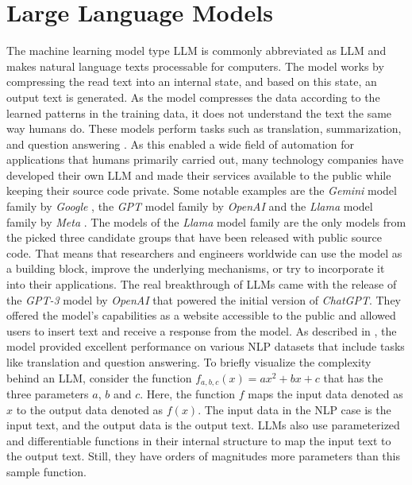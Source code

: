 \documentclass[draft,final]{thesisclass} %
\begin{document}
\section{Large Language Models}
The machine learning model type \gls{LLM} is commonly abbreviated as \gls{LLM} and makes natural language texts processable for computers.
The model works by compressing the read text into an internal state, and based on this state, an output text is generated.
As the model compresses the data according to the learned patterns in the training data, it does not understand the text the same way humans do.
These models perform tasks such as translation, summarization, and question answering \parencite[1]{llm_literature_review}.
As this enabled a wide field of automation for applications that humans primarily carried out, many technology companies have developed their own \gls{LLM} and made their services available to the public while keeping their source code private.
Some notable examples are the \textit{Gemini} model family by \textit{Google} \parencite{gemini} \parencite{gemini_1.5} \parencite{gemini_flash}, the \textit{GPT} model family by \textit{OpenAI} \parencite{gpt3} \parencite{gpt4} \parencite{gpt4_turbo} \parencite{gpt4o} and the \textit{Llama} model family by \textit{Meta} \parencite{llama2} \parencite{llama3}.
The models of the \textit{Llama} model family are the only models from the picked three candidate groups that have been released with public source code.
That means that researchers and engineers worldwide can use the model as a building block, improve the underlying mechanisms, or try to incorporate it into their applications.
The real breakthrough of \gls{LLM}s came with the release of the \textit{GPT-3} model by \textit{OpenAI} \parencite{gpt3} that powered the initial version of \textit{ChatGPT}.
They offered the model's capabilities as a website accessible to the public and allowed users to insert text and receive a response from the model.
As described in \textcite[1]{gpt3}, the model provided excellent performance on various \acs{NLP} datasets that include tasks like translation and question answering.
To briefly visualize the complexity behind an \gls{LLM}, consider the function $f_{a,b,c}(x) = ax^2+bx+c$ that has the three parameters $a$, $b$ and $c$.
Here, the function $f$ maps the input data denoted as $x$ to the output data denoted as $f(x)$.
The input data in the \acs{NLP} case is the input text, and the output data is the output text.
\gls{LLM}s also use parameterized and differentiable functions in their internal structure to map the input text to the output text. Still, they have orders of magnitudes more parameters than this sample function.
\end{document}
